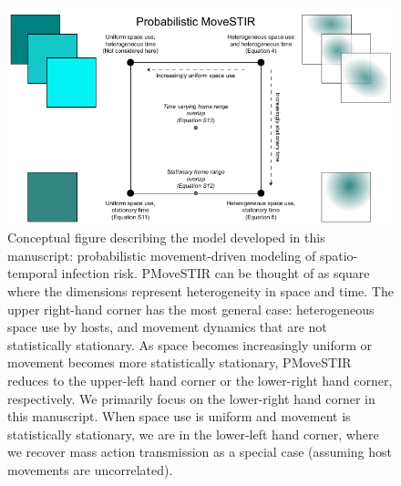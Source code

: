 \documentclass[letterpaper]{article}
\begin{document}
\begin{figure}
    \includegraphics[width=\textwidth]{figures/conceptual_figure_pmovestir_mod.pdf}
    \caption{Conceptual figure describing the model developed in this manuscript: probabilistic movement-driven modeling of spatio-temporal infection risk. PMoveSTIR can be thought of as square where the dimensions represent heterogeneity in space and time. The upper right-hand corner has the most general case: heterogeneous space use by hosts, and movement dynamics that are not statistically stationary.  As space becomes increasingly uniform or movement becomes more statistically stationary, PMoveSTIR reduces to the upper-left hand corner or the lower-right hand corner, respectively.  We primarily focus on the lower-right hand corner in this manuscript.  When space use is uniform and movement is statistically stationary, we are in the lower-left hand corner, where we recover mass action transmission as a special case (assuming host movements are uncorrelated).}
	\label{fig:square}
\end{figure}
\end{document}
